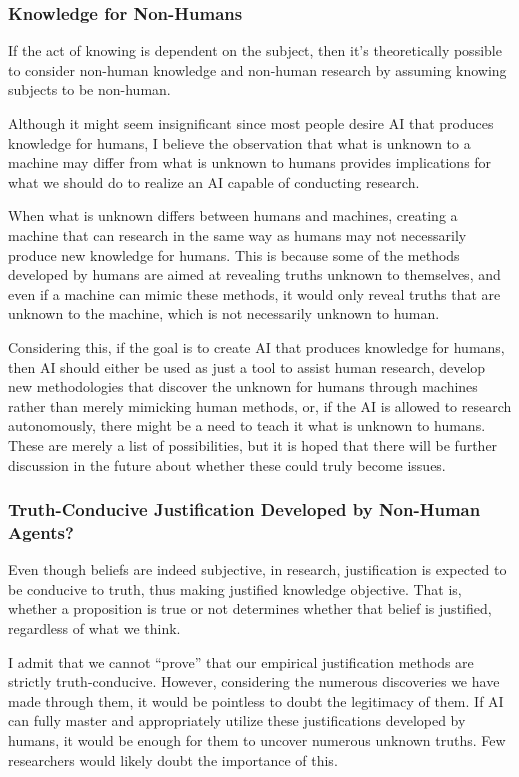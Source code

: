 \subsubsection{Knowledge for Non-Humans}
If the act of knowing is dependent on the subject, then it's theoretically possible to consider non-human knowledge and non-human research by assuming knowing subjects to be non-human. 

Although it might seem insignificant since most people desire AI that produces knowledge for humans, I believe the observation that what is unknown to a machine may differ from what is unknown to humans provides implications for what we should do to realize an AI capable of conducting research.

When what is unknown differs between humans and machines, creating a machine that can research in the same way as humans may not necessarily produce new knowledge for humans. This is because some of the methods developed by humans are aimed at revealing truths unknown to themselves, and even if a machine can mimic these methods, it would only reveal truths that are unknown to the machine, which is not necessarily unknown to human.

Considering this, if the goal is to create AI that produces knowledge for humans, then AI should either be used as just a tool to assist human research, develop new methodologies that discover the unknown for humans through machines rather than merely mimicking human methods, or, if the AI is allowed to research autonomously, there might be a need to teach it what is unknown to humans. These are merely a list of possibilities, but it is hoped that there will be further discussion in the future about whether these could truly become issues.


\subsubsection{Truth-Conducive Justification Developed by Non-Human Agents?}

Even though beliefs are indeed subjective, in research, justification is expected to be conducive to truth, thus making justified knowledge objective. That is, whether a proposition is true or not determines whether that belief is justified, regardless of what we think.

I admit that we cannot ``prove'' that our empirical justification methods are strictly truth-conducive. However, considering the numerous discoveries we have made through them, it would be pointless to doubt the legitimacy of them. If AI can fully master and appropriately utilize these justifications developed by humans, it would be enough for them to uncover numerous unknown truths. Few researchers would likely doubt the importance of this.

